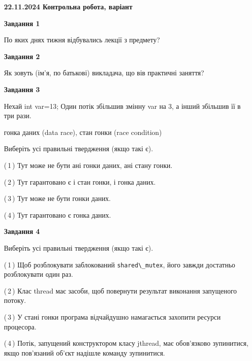 \documentclass[12pt, ukrainian]{article}
\def\code#1{\Verb!#1!}
\begin{document}
\begin {large}

\textbf{22.11.2024 Контрольна робота, варіант  }\par


{

\begin{center}
\textbf{Завдання 1}
\end{center}

По яких днях тижня відбувались лекції з предмету?


\begin{center}
\textbf{Завдання 2}
\end{center}

Як зовуть (ім'я, по батькові) викладача, що вів практичні заняття?


\begin{center}
\textbf{Завдання 3}
\end{center}

Нехай int var=13; Один потік збільшив змінну var на 3, а інший збільшив її в три рази.

гонка даних (data race), стан гонки (race condition)

Виберіть усі правильні твердження (якщо такі є).\par
\vspace{2mm}
(\,1\,) Тут може не бути ані гонки даних, ані стану гонки.%

(\,2\,) Тут гарантовано є і стан гонки, і гонка даних.%

(\,3\,) Тут може не бути гонки даних.%

(\,4\,) Тут гарантовано є гонка даних.%


\begin{center}
\textbf{Завдання 4}
\end{center}

Виберіть усі правильні твердження (якщо такі є).\par
\vspace{2mm}

(\,1\,) Щоб розблокувати заблокований \code{shared\_mutex}, його завжди достатньо розблокувати один раз.%

(\,2\,) Клас thread має засоби, щоб повернути результат виконання запущеного потоку.%

(\,3\,) У стані гонки програма відчайдушно намагається захопити ресурси процесора.%

(\,4\,) Потік, запущений конструктором класу jthread, має обов’язково зупинитися, якщо пов’язаний об’єкт надішле команду зупинитися.%


}
\end{large}
\end{document}
